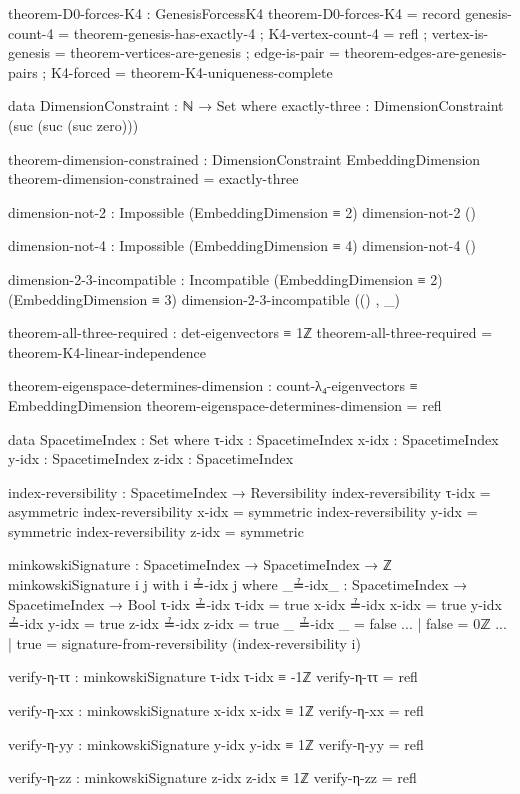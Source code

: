 \documentclass[11pt,a4paper]{book}
\begin{document}
\begin{code}
theorem-D0-forces-K4 : GenesisForcessK4
theorem-D0-forces-K4 = record
  { genesis-count-4 = theorem-genesis-has-exactly-4
  ; K4-vertex-count-4 = refl
  ; vertex-is-genesis = theorem-vertices-are-genesis
  ; edge-is-pair = theorem-edges-are-genesis-pairs
  ; K4-forced = theorem-K4-uniqueness-complete
  }

data DimensionConstraint : ℕ → Set where
  exactly-three : DimensionConstraint (suc (suc (suc zero)))

theorem-dimension-constrained : DimensionConstraint EmbeddingDimension
theorem-dimension-constrained = exactly-three

dimension-not-2 : Impossible (EmbeddingDimension ≡ 2)
dimension-not-2 ()

dimension-not-4 : Impossible (EmbeddingDimension ≡ 4)
dimension-not-4 ()

dimension-2-3-incompatible : Incompatible (EmbeddingDimension ≡ 2) (EmbeddingDimension ≡ 3)
dimension-2-3-incompatible (() , _)

theorem-all-three-required : det-eigenvectors ≡ 1ℤ
theorem-all-three-required = theorem-K4-linear-independence

theorem-eigenspace-determines-dimension : 
  count-λ₄-eigenvectors ≡ EmbeddingDimension
theorem-eigenspace-determines-dimension = refl

data SpacetimeIndex : Set where
  τ-idx : SpacetimeIndex
  x-idx : SpacetimeIndex
  y-idx : SpacetimeIndex
  z-idx : SpacetimeIndex

index-reversibility : SpacetimeIndex → Reversibility
index-reversibility τ-idx = asymmetric
index-reversibility x-idx = symmetric
index-reversibility y-idx = symmetric
index-reversibility z-idx = symmetric

minkowskiSignature : SpacetimeIndex → SpacetimeIndex → ℤ
minkowskiSignature i j with i ≟-idx j
  where
    _≟-idx_ : SpacetimeIndex → SpacetimeIndex → Bool
    τ-idx ≟-idx τ-idx = true
    x-idx ≟-idx x-idx = true
    y-idx ≟-idx y-idx = true
    z-idx ≟-idx z-idx = true
    _     ≟-idx _     = false
... | false = 0ℤ
... | true  = signature-from-reversibility (index-reversibility i)

verify-η-ττ : minkowskiSignature τ-idx τ-idx ≡ -1ℤ
verify-η-ττ = refl

verify-η-xx : minkowskiSignature x-idx x-idx ≡ 1ℤ
verify-η-xx = refl

verify-η-yy : minkowskiSignature y-idx y-idx ≡ 1ℤ
verify-η-yy = refl

verify-η-zz : minkowskiSignature z-idx z-idx ≡ 1ℤ
verify-η-zz = refl


\end{code}
\end{document}
